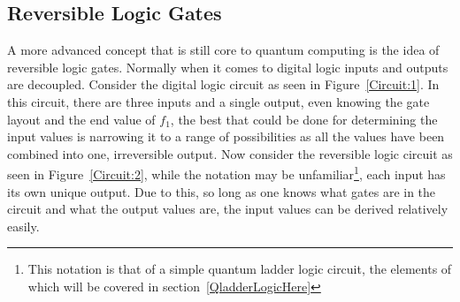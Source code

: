 \documentclass[a4paper]{article}
\begin{document}

\subsection{Reversible Logic Gates} %
A more advanced concept that is still core to quantum computing is the idea of reversible logic gates. Normally when it comes to digital logic inputs and outputs are decoupled. Consider the digital logic circuit as seen in Figure~\ref{Circuit:1}.  In this circuit, there are three inputs and a single output, even knowing the gate layout and the end value of $f_{1}$, the best that could be done for determining the input values is narrowing it to a range of possibilities as all the values have been combined into one, irreversible output. Now consider the reversible logic circuit as seen in Figure~\ref{Circuit:2}, while the notation may be unfamiliar\footnote{This notation is that of a simple quantum ladder logic circuit, the elements of which will be covered in section~\ref{QladderLogicHere}}, each input has its own unique output.  Due to this, so long as one knows what gates are in the circuit and what the output values are, the input values can be derived relatively easily.

\end{document}
